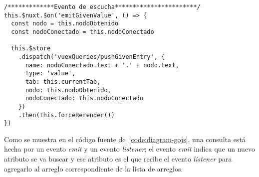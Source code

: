 \begin{code}
\begin{verbatim}
/*************Evento de escucha***********************/
this.$nuxt.$on('emitGivenValue', () => {
  const nodo = this.nodoObtenido
  const nodoConectado = this.nodoConectado

  this.$store
    .dispatch('vuexQueries/pushGivenEntry', {
      name: nodoConectado.text + '.' + nodo.text,
      type: 'value',
      tab: this.currentTab,
      nodo: this.nodoObtenido,
      nodoConectado: this.nodoConectado
    })
    .then(this.forceRerender())
})

\end{verbatim}
\end{code}

Como se muestra en el código fuente de~\ref{code:diagram-gojs}, una consulta está hecha por un evento \textit{emit} y un evento \textit{listener}; el evento \textit{emit} indica que un nuevo atributo se va buscar y ese atributo es el que recibe el evento \textit{listener} para agregarlo al arreglo correspondiente de la lista de arreglos.